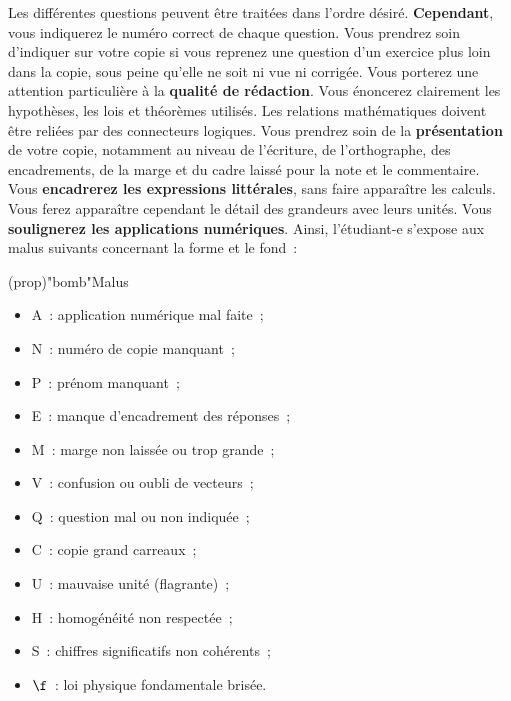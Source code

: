 \documentclass[a4paper, 10pt, garamond]{book}
\begin{document}
{Les différentes questions peuvent être traitées dans l'ordre désiré.
\textbf{Cependant}, vous indiquerez le numéro correct de chaque question. Vous
prendrez soin d'indiquer sur votre copie si vous reprenez une question d'un
exercice plus loin dans la copie, sous peine qu'elle ne soit ni vue ni
corrigée.
\bigbreak
Vous porterez une attention particulière à la \textbf{qualité de rédaction}.
Vous énoncerez clairement les hypothèses, les lois et théorèmes utilisés. Les
relations mathématiques doivent être reliées par des connecteurs logiques.
\bigbreak
Vous prendrez soin de la \textbf{présentation} de votre copie, notamment au
niveau de l'écriture, de l'orthographe, des encadrements, de la marge et du
cadre laissé pour la note et le commentaire. Vous \textbf{encadrerez les
	expressions littérales}, sans faire apparaître les calculs. Vous ferez
apparaître cependant le détail des grandeurs avec leurs unités. Vous
\textbf{soulignerez les applications numériques}.
\bigbreak
Ainsi, l'étudiant-e s'expose aux malus suivants concernant la forme et le
fond~:
\begin{tcn}(prop)"bomb"{Malus}
	\begin{minipage}[t]{0.50\linewidth}
		\begin{itemize}
			\item A~: application numérique mal faite~;
			\item N~: numéro de copie manquant~;
			\item P~: prénom manquant~;
			\item E~: manque d'encadrement des réponses~;
			\item M~: marge non laissée ou trop grande~;
			\item V~: confusion ou oubli de vecteurs~;
		\end{itemize}
	\end{minipage}
	\begin{minipage}[t]{0.50\linewidth}
		\begin{itemize}
			\item Q~: question mal ou non indiquée~;
			\item C~: copie grand carreaux~;
			\item U~: mauvaise unité (flagrante)~;
			\item H~: homogénéité non respectée~;
			\item S~: chiffres significatifs non cohérents~;
			\item $\f$~: loi physique fondamentale brisée.
		\end{itemize}
	\end{minipage}
\end{tcn}

}
\end{document}
